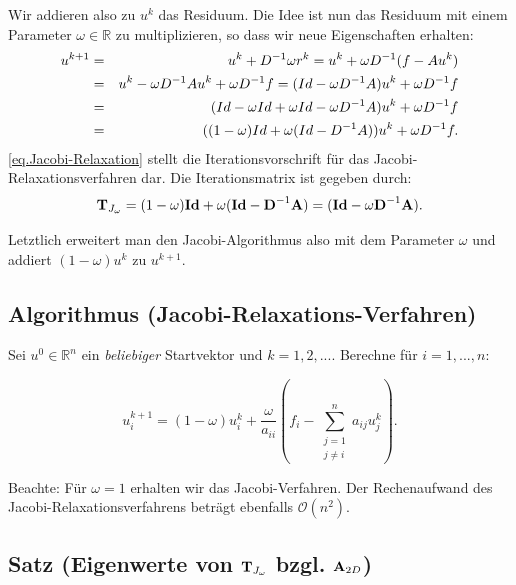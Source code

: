 Wir addieren also zu $u^{k}$ das Residuum. Die Idee ist nun das Residuum mit einem Parameter $\omega \in \mathbb{R}$ zu multiplizieren, so dass wir neue Eigenschaften erhalten:
\begin{eqnarray}
u^{k+1} &=& u^{k} + D^{-1} \omega r^{k} = u^{k} + \omega D^{-1} (f - Au^{k}) \notag \\
&=& u^{k} - \omega D^{-1} Au^{k} + \omega D^{-1}f = (Id - \omega D^{-1} A)u^{k} + \omega D^{-1}f \notag \\
&=& (Id - \omega Id + \omega Id - \omega D^{-1} A)u^{k} + \omega D^{-1}f \notag \\
&=& ((1 - \omega)Id + \omega(Id - D^{-1}A)) u^{k} + \omega D^{-1}f.\label{eq.Jacobi-Relaxation}
\end{eqnarray}
\autoref{eq.Jacobi-Relaxation} stellt die Iterationsvorschrift für das Jacobi-Relaxationsverfahren dar. Die Iterationsmatrix ist gegeben durch:
\begin{equation}
{\textbf{T}}_{J_{\omega}} = (1 - \omega) {\textbf{Id}} + \omega({\textbf{Id}} - {\textbf{D}}^{-1} {\textbf{A}}) = ({\textbf{Id}} - \omega {\textbf{D}}^{-1} {\textbf{A}}).
\end{equation}

Letztlich erweitert man den Jacobi-Algorithmus also mit dem Parameter $\omega$ und addiert $(1 - \omega)u^{k}$ zu $u^{k+1}$.

\subsection{Algorithmus (Jacobi-Relaxations-Verfahren)}\label{ss.Algorithmus Jacobi Relax}

Sei $u^{0} \in \mathbb{R}^{n}$ ein \textit{beliebiger} Startvektor und $k=1,2,...$. Berechne für $i=1,...,n$:

\begin{equation}
u^{k+1}_{i} = (1 - \omega)u^{k}_{i} + \frac {\omega} {a_{ii}} (f_{i} - \sum_{\substack{j = 1 \\ j \ne i}}^{n} a_{ij}u^{k}_{j}).
\end{equation}

Beachte: Für $\omega = 1$ erhalten wir das Jacobi-Verfahren. Der Rechenaufwand des Jacobi-Relaxationsverfahrens beträgt ebenfalls $\mathcal{O}(n^{2})$.

\subsection{Satz (Eigenwerte von ${\textbf{T}}_{J_{\omega}}$ bzgl. ${\textbf{A}}_{2D}$)}\label{ss.EW Relax}

